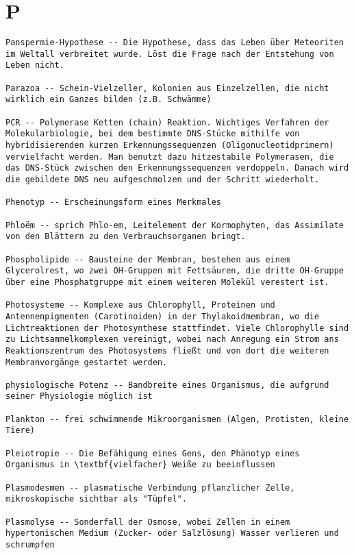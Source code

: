 \documentclass{article}
\begin{document}
\section{P}
\begin{verbatim}
Panspermie-Hypothese -- Die Hypothese, dass das Leben über Meteoriten im Weltall verbreitet wurde. Löst die Frage nach der Entstehung von Leben nicht. 

Parazoa -- Schein-Vielzeller, Kolonien aus Einzelzellen, die nicht wirklich ein Ganzes bilden (z.B. Schwämme)

PCR -- Polymerase Ketten (chain) Reaktion. Wichtiges Verfahren der Molekularbiologie, bei dem bestimmte DNS-Stücke mithilfe von hybridisierenden kurzen Erkennungssequenzen (Oligonucleotidprimern) vervielfacht werden. Man benutzt dazu hitzestabile Polymerasen, die das DNS-Stück zwischen den Erkennungssequenzen verdoppeln. Danach wird die gebildete DNS neu aufgeschmolzen und der Schritt wiederholt.

Phenotyp -- Erscheinungsform eines Merkmales

Phloëm -- sprich Phlo-em, Leitelement der Kormophyten, das Assimilate von den Blättern zu den Verbrauchsorganen bringt.

Phospholipide -- Bausteine der Membran, bestehen aus einem Glycerolrest, wo zwei OH-Gruppen mit Fettsäuren, die dritte OH-Gruppe über eine Phosphatgruppe mit einem weiteren Molekül verestert ist.

Photosysteme -- Komplexe aus Chlorophyll, Proteinen und Antennenpigmenten (Carotinoiden) in der Thylakoidmembran, wo die Lichtreaktionen der Photosynthese stattfindet. Viele Chlorophylle sind zu Lichtsammelkomplexen vereinigt, wobei nach Anregung ein Strom ans Reaktionszentrum des Photosystems fließt und von dort die weiteren Membranvorgänge gestartet werden.

physiologische Potenz -- Bandbreite eines Organismus, die aufgrund seiner Physiologie möglich ist

Plankton -- frei schwimmende Mikroorganismen (Algen, Protisten, kleine Tiere)

Pleiotropie -- Die Befähigung eines Gens, den Phänotyp eines Organismus in \textbf{vielfacher} Weiße zu beeinflussen

Plasmodesmen -- plasmatische Verbindung pflanzlicher Zelle, mikroskopische sichtbar als "Tüpfel".

Plasmolyse -- Sonderfall der Osmose, wobei Zellen in einem hypertonischen Medium (Zucker- oder Salzlösung) Wasser verlieren und schrumpfen


\end{verbatim}
\end{document}
